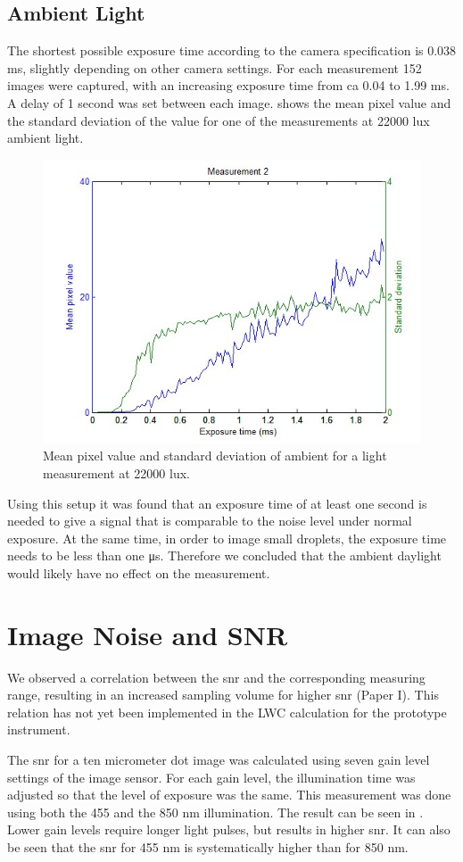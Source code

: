 \subsection{Ambient Light}

The shortest possible exposure time according to the camera specification is 0.038 ms, slightly depending on other camera settings. For each measurement 152 images were captured, with an increasing exposure time from ca 0.04 to 1.99 ms. A delay of 1 second was set between each image.  shows the mean pixel value and the standard deviation of the value for one of the measurements at 22000 lux ambient light.

\begin{figure}%
\centering\includegraphics[width=0.6\linewidth]{figures/Amblight22000lux}
\caption{Mean pixel value and standard deviation of ambient for a light measurement at 22000 lux.}
\label{fig:ambientlight}
\end{figure}

Using this setup it was found that an exposure time of at least one second is needed to give a signal that is comparable to the noise level under normal exposure. At the same time, in order to image small droplets, the exposure time needs to be less than one μs. Therefore we concluded that the ambient daylight would likely have no effect on the measurement.

\section{Image Noise and SNR}

We observed a correlation between the \gls{snr} and the corresponding measuring range, resulting in an increased sampling volume for higher \gls{snr} \cite{ryd2015}(Paper I). This relation has not yet been implemented in the LWC calculation for the prototype instrument.

The \gls{snr} for a ten micrometer dot image was calculated using seven gain level settings of the image sensor. For each gain level, the illumination time was adjusted so that the level of exposure was the same. This measurement was done using both the 455 and the 850 nm illumination. The result can be seen in . Lower gain levels require longer light pulses, but results in higher \gls{snr}. It can also be seen that the \gls{snr} for 455 nm is systematically higher than for 850 nm. 

